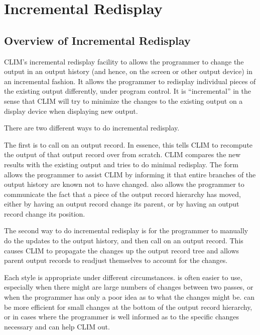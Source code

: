 
\chapter {Incremental Redisplay}
\label {incremental-redisplay}

\section {Overview of Incremental Redisplay}

CLIM's incremental redisplay facility to allows the programmer to change the
output in an output history (and hence, on the screen or other output device) in
an incremental fashion.  It allows the programmer to redisplay individual pieces
of the existing output differently, under program control.  It is
``incremental'' in the sense that CLIM will try to minimize the changes to the
existing output on a display device when displaying new output.

There are two different ways to do incremental redisplay.

The first is to call  on an output record.  In essence, this tells
CLIM to recompute the output of that output record over from scratch.  CLIM
compares the new results with the existing output and tries to do minimal
redisplay.  The  form allows the programmer to assist CLIM
by informing it that entire branches of the output history are known not to have
changed.   also allows the programmer to communicate the
fact that a piece of the output record hierarchy has moved, either by having an
output record change its parent, or by having an output record change its
position.

The second way to do incremental redisplay is for the programmer to manually do the
updates to the output history, and then call 
on an output record.  This causes CLIM to propagate the changes up the output
record tree and allows parent output records to readjust themselves to account for
the changes.

Each style is appropriate under different circumstances.   is
often easier to use, especially when there might are large numbers of changes
between two passes, or when the programmer has only a poor idea as to what the
changes might be.   can be more efficient
for small changes at the bottom of the output record hierarchy, or in cases
where the programmer is well informed as to the specific changes necessary and
can help CLIM out.


